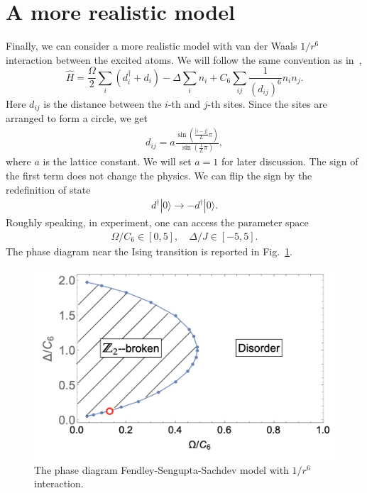 \documentclass[prb,twocolumn,11pt]{revtex4-1}
\begin{document}
\section{A more realistic model}
Finally, we can consider a more realistic model with van der Waals $1/r^6$ interaction between the excited atoms. We will follow the same convention as in~\cite{FangFang:2024eaw},
\begin{equation}
    \hat{H}=\frac{\Omega}{2} \sum_i (d_i^{\dagger}+d_i)- \Delta \sum_i n_i + C_6\sum_{ij}\frac{1}{(d_{ij})^6}  n_{i}n_{j}.
\end{equation}
Here $d_{ij}$ is the distance between the $i$-th and $j$-th sites. Since the sites are arranged to form a circle, we get
\begin{align}
    d_{ij}=a \frac{\sin(\frac{|i-j|}{L}\pi)}{\sin(\frac{1}{L}\pi)},
\end{align}
where $a$ is the lattice constant. We will set $a=1$ for later discussion. 
The sign of the first term does not change the physics. We can flip the sign by the redefinition of state 
\begin{align}
d^{\dagger}|0\rangle \rightarrow -d^{\dagger}|0\rangle. 
\end{align}
Roughly speaking, in experiment, one can access the parameter space 
\begin{align}
\Omega/C_6 \in [0,5],\quad \Delta/J \in[-5,5].
\end{align}
The phase diagram near the Ising transition is reported in Fig.~\ref{phasediagramHBlong}.
\begin{figure}[htbp]
\centering
\includegraphics[scale=0.5]{phase_diagram_SSF_LR.png}
\caption{The phase diagram Fendley-Sengupta-Sachdev model with $1/r^6$ interaction.}
\label{phasediagramHBlong}
\end{figure}
\end{document}
